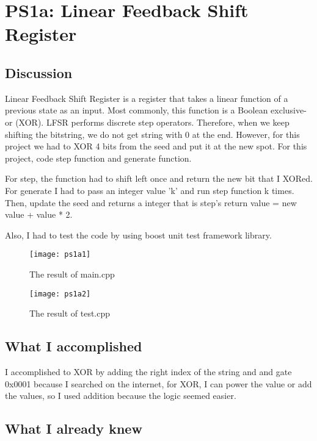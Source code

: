 \section{PS1a: Linear Feedback Shift Register}\label{sec:ps1a}

\subsection{Discussion}\label{sec:ps1a:disc}

Linear Feedback Shift Register is a register that takes a linear function of a previous state as an input. Most commonly, this function is a Boolean exclusive-or (XOR). LFSR performs discrete step operators. Therefore, when we keep shifting the bitstring, we do not get string with 0 at the end. However, for this project we had to XOR 4 bits from the seed and put it at the new spot.
For this project, code step function and generate function.

For step, the function had to shift left once and return the new bit that I XORed. For generate I had to pass an integer value 'k' and run step function k times. Then, update the seed and returns a integer that is step's return value = new value + value * 2.

Also, I had to test the code by using boost unit test framework library.

\begin{figure}[tbh]
	\centering
	\texttt{[image: ps1a1]}
	\caption{The result of main.cpp}
	\label{fig:PS1a Result}
\end{figure}

\begin{figure}[tbh]
	\centering
	\texttt{[image: ps1a2]}
	\caption{The result of test.cpp}
	\label{fig:PS1a Test}
\end{figure}



\subsection{What I accomplished}\label{sec:ps1a:accomplish}

I accomplished to XOR by adding the right index of the string and and gate 0x0001 because I searched on the internet, for XOR, I can power the value or add the values, so I used addition because the logic seemed easier.



\subsection{What I already knew}\label{sec:ps1a:knew}

